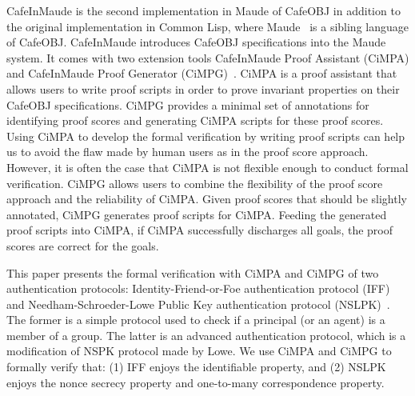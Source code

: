 \documentclass[10pt, conference, compsocconf]{IEEEtran}
\begin{document}
 
CafeInMaude is the second implementation in Maude of CafeOBJ in addition to the original implementation in Common Lisp, where Maude~\cite{ClavelEtal2007maude} is a sibling language of CafeOBJ.
CafeInMaude introduces CafeOBJ specifications into the Maude system. 
It comes with two extension tools  CafeInMaude Proof Assistant (CiMPA) and CafeInMaude Proof Generator (CiMPG)~\cite{RiescoO18tosem}. 
CiMPA is a proof assistant that allows users to write proof scripts in order to prove invariant properties on their CafeOBJ specifications. CiMPG provides a minimal set of annotations for identifying proof scores and generating CiMPA scripts for these proof scores. 
Using CiMPA to develop the formal verification by writing proof scripts can help us to avoid the flaw made by human users as in the proof score approach. 
However, it is often the case that CiMPA is not flexible enough to conduct formal verification.
CiMPG allows users to combine the flexibility of the proof score approach and the reliability of CiMPA. Given proof scores that should be slightly annotated, CiMPG generates proof scripts for CiMPA. Feeding the generated proof scripts into CiMPA, if CiMPA successfully discharges all goals, the proof scores are correct for the goals. 

This paper presents the formal verification with CiMPA and CiMPG of two authentication protocols: Identity-Friend-or-Foe authentication protocol (IFF)~\cite{iff2001} and Needham-Schroeder-Lowe Public Key authentication protocol (NSLPK)~\cite{nslpk95}.
The former is a simple protocol used to check if a principal (or an agent) is a member of a group.
The latter is an advanced authentication protocol, which is a modification of NSPK protocol \cite{nspk78} made by Lowe.
We use CiMPA and CiMPG to formally verify that: (1) IFF enjoys the identifiable property, and (2) NSLPK enjoys the nonce secrecy property and one-to-many correspondence property.

\end{document}
